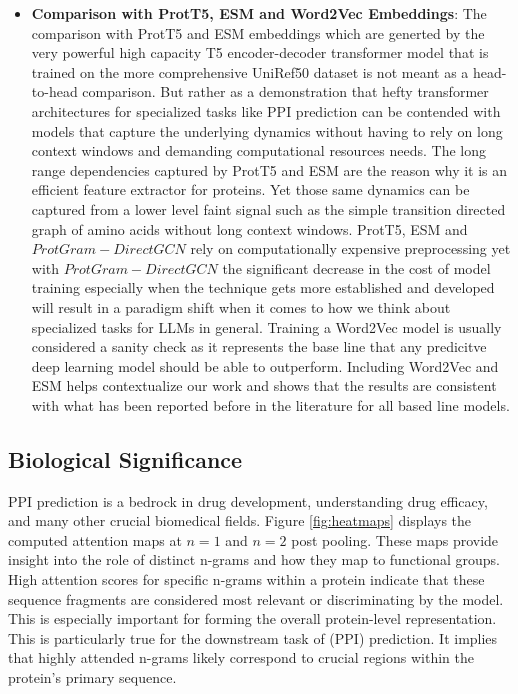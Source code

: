 \documentclass[utf8]{article}
\begin{document}
\begin{itemize}
		\item \textbf{Comparison with ProtT5, ESM and Word2Vec Embeddings}: The comparison with ProtT5 and ESM embeddings which are generted by the very powerful high capacity T5 encoder-decoder transformer model that is trained on the more comprehensive UniRef50 dataset is not meant as a head-to-head comparison. But rather as a demonstration that hefty transformer architectures for specialized tasks like PPI prediction can be contended with models that capture the underlying dynamics without having to rely on long context windows and demanding computational resources needs. The long range dependencies captured by ProtT5 and ESM are the reason why it is an efficient feature extractor for proteins. Yet those same dynamics can be captured from a lower level faint signal such as the simple transition directed graph of amino acids without long context windows. ProtT5, ESM and $ProtGram-DirectGCN$ rely on computationally expensive preprocessing yet with $ProtGram-DirectGCN$ the significant decrease in the cost of model training especially when the technique gets more established and developed will result in a paradigm shift when it comes to how we think about specialized tasks for LLMs in general. Training a Word2Vec model is usually considered a sanity check as it represents the base line that any predicitve deep learning model should be able to outperform. Including Word2Vec and ESM helps contextualize our work and shows that the results are consistent with what has been reported before in the literature for all based line models.
	\end{itemize}
	
	\subsection{Biological Significance}
	\label{subsec:significance}
	PPI prediction is a bedrock in drug development, understanding drug efficacy, and many other crucial biomedical fields. Figure \ref{fig:heatmaps} displays the computed attention maps at $n=1$ and $n=2$ post pooling. These maps provide insight into the role of distinct n-grams and how they map to functional groups. High attention scores for specific n-grams within a protein indicate that these sequence fragments are considered most relevant or discriminating by the model. This is especially important for forming the overall protein-level representation. This is particularly true for the downstream task of (PPI) prediction. It implies that highly attended n-grams likely correspond to crucial regions within the protein's primary sequence.
	
\end{document}
